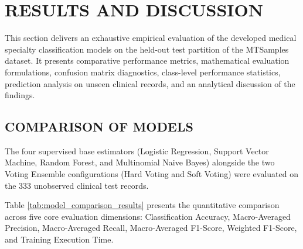 \clearpage

\section{RESULTS AND DISCUSSION}

This section delivers an exhaustive empirical evaluation of the developed medical specialty classification models on the held-out test partition of the MTSamples dataset. It presents comparative performance metrics, mathematical evaluation formulations, confusion matrix diagnostics, class-level performance statistics, prediction analysis on unseen clinical records, and an analytical discussion of the findings.

\subsection{COMPARISON OF MODELS}

The four supervised base estimators (Logistic Regression, Support Vector Machine, Random Forest, and Multinomial Naive Bayes) alongside the two Voting Ensemble configurations (Hard Voting and Soft Voting) were evaluated on the 333 unobserved clinical test records. 

Table \ref{tab:model_comparison_results} presents the quantitative comparison across five core evaluation dimensions: Classification Accuracy, Macro-Averaged Precision, Macro-Averaged Recall, Macro-Averaged F1-Score, Weighted F1-Score, and Training Execution Time.

\begin{table}[H]
\centering
\small
{}
\caption{Empirical Performance Comparison of Base Models and Voting Ensembles (8 Specialties)}
\label{tab:model_comparison_results}
\end{table}

